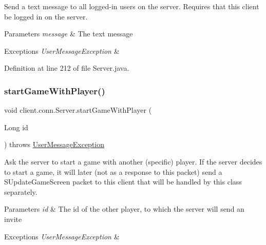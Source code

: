 Send a text message to all logged-\/in users on the server. Requires that this client be logged in on the server. 
\begin{DoxyParams}{Parameters}
{\em message} & The text message \\
\hline
\end{DoxyParams}

\begin{DoxyExceptions}{Exceptions}
{\em User\+Message\+Exception} & \\
\hline
\end{DoxyExceptions}


Definition at line 212 of file Server.\+java.

\hypertarget{classclient_1_1conn_1_1_server_a6336de53822bd12d42e8445a598f2838}{}\label{classclient_1_1conn_1_1_server_a6336de53822bd12d42e8445a598f2838} 
\subsubsection{\texorpdfstring{start\+Game\+With\+Player()}{startGameWithPlayer()}}
{\footnotesize\ttfamily void client.\+conn.\+Server.\+start\+Game\+With\+Player (\begin{DoxyParamCaption}\item[{Long}]{id }\end{DoxyParamCaption}) throws \hyperlink{classpt_1_1up_1_1fe_1_1lpro1613_1_1sharedlib_1_1exceptions_1_1_user_message_exception}{User\+Message\+Exception}}

Ask the server to start a game with another (specific) player. If the server decides to start a game, it will later (not as a response to this packet) send a S\+Update\+Game\+Screen packet to this client that will be handled by this class separately. 
\begin{DoxyParams}{Parameters}
{\em id} & The id of the other player, to which the server will send an invite \\
\hline
\end{DoxyParams}

\begin{DoxyExceptions}{Exceptions}
{\em User\+Message\+Exception} & \\
\hline
\end{DoxyExceptions}


